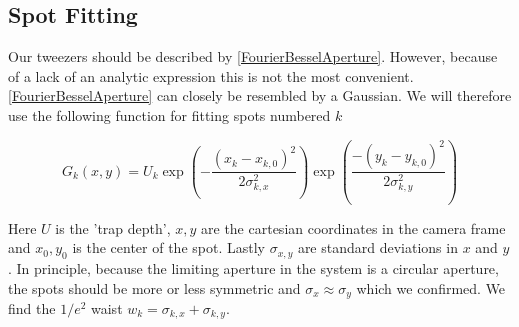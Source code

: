\subsection{Spot Fitting}

Our tweezers should be described by \cref{FourierBesselAperture}. However, because of a lack of an analytic expression this is not the most convenient. \cref{FourierBesselAperture} can closely be resembled by a Gaussian. We will therefore use the following function for fitting spots numbered $k$

\begin{equation}\label{2DGaussian}
    G_k(x,y) = U_k \exp{\left(-\frac{(x_k-x_{k,0})^2}{2\sigma_{k,x}^2}\right)}
    \exp{\left( \frac{-(y_k-y_{k,0})^2}{2\sigma_{k,y}^2} \right)}
\end{equation}

Here $U$ is the 'trap depth', $x,y$ are the cartesian coordinates in the camera frame and $x_0,y_0$ is the center of the spot. Lastly $\sigma_{x,y}$ are standard deviations in $x$ and $y$. In principle, because the limiting aperture in the system is a circular aperture, the spots should be more or less symmetric and $\sigma_x\approx \sigma_y$ which we confirmed. We find the $1/e^2$ waist $w_k=\sigma_{k,x}+\sigma_{k,y}$. 
